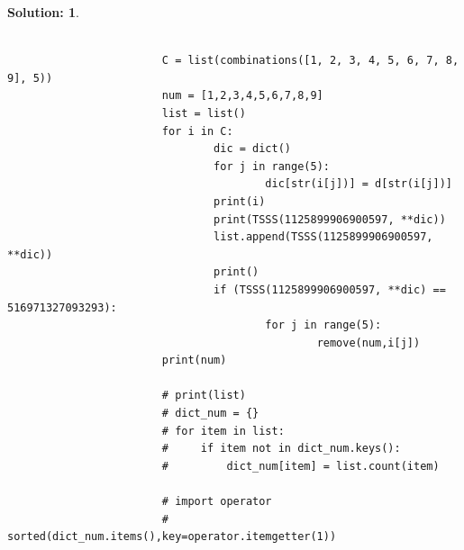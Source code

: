 \documentclass{article}
\theoremstyle{break}
\newtheorem*{solution*}{\textbf{Solution:} }
\begin{document}
\begin{enumerate}
\begin{solution*}
\begin{lstlisting}
                        
                        C = list(combinations([1, 2, 3, 4, 5, 6, 7, 8, 9], 5))
                        num = [1,2,3,4,5,6,7,8,9]
                        list = list()
                        for i in C:
                                dic = dict()
                                for j in range(5):
                                        dic[str(i[j])] = d[str(i[j])]
                                print(i)
                                print(TSSS(1125899906900597, **dic))
                                list.append(TSSS(1125899906900597, **dic))
                                print()
                                if (TSSS(1125899906900597, **dic) == 516971327093293):
                                        for j in range(5):
                                                remove(num,i[j])
                        print(num)
                        
                        # print(list)
                        # dict_num = {}
                        # for item in list:
                        #     if item not in dict_num.keys():
                        #         dict_num[item] = list.count(item)
                        
                        # import operator
                        # sorted(dict_num.items(),key=operator.itemgetter(1))
                        

\end{lstlisting}
\end{solution*}
\end{enumerate}
\end{document}
